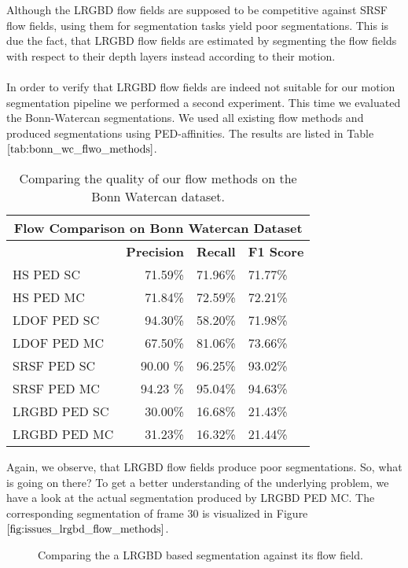 Although the LRGBD flow fields are supposed to be competitive against SRSF flow fields, using them for segmentation tasks yield poor segmentations. This is due the fact, that LRGBD flow fields are estimated by segmenting the flow fields with respect to their depth layers instead according to their motion. \\ \\

In order to verify that LRGBD flow fields are indeed not suitable for our motion segmentation pipeline we performed a second experiment. This time we evaluated the Bonn-Watercan segmentations. We used all existing flow methods and produced segmentations using PED-affinities. The results are listed in Table $\ref{tab:bonn_wc_flwo_methods}$.
\begin{table}[H]
\centering
\begin{tabular}{|l|r|l|l|}
\hline
\multicolumn{4}{|c|}{Flow Comparison on Bonn Watercan Dataset} \\ \hline
& \textbf{Precision} & \textbf{Recall} & \textbf{F1 Score} \\ \hline            
HS PED SC  & 71.59\%   & 71.96\%     & 71.77\%  \\ \hline
HS PED MC  & 71.84\%   & 72.59\%     & 72.21\%  \\ \hline                        
LDOF PED SC  & 94.30\%   & 58.20\%     & 71.98\%  \\ \hline
LDOF PED MC  & 67.50\%   & 81.06\%     & 73.66\%  \\ \hline
SRSF PED SC & 90.00 \%   & 96.25\%     & 93.02\%  \\ \hline
SRSF PED MC & 94.23 \%   & 95.04\%     & 94.63\%  \\ \hline
LRGBD PED SC & 30.00\%   & 16.68\%     & 21.43\%  \\ \hline
LRGBD PED MC & 31.23\%   & 16.32\%     & 21.44\%  \\ \hline
\end{tabular}
\caption[Flow Method Comparission Bonn Watercan]{Comparing the quality of our flow methods on the Bonn Watercan dataset.}
\label{tab:bonn_wc_flwo_methods}
\end{table}
Again, we observe, that LRGBD flow fields produce poor segmentations. So, what is going on there? To get a better understanding of the underlying problem, we have a look at the actual segmentation produced by LRGBD PED MC. The corresponding segmentation of frame 30 is visualized in Figure $\ref{fig:issues_lrgbd_flow_methods}$. 
\begin{figure}[H]
\begin{center}
\end{center}
\caption[Issue with LRGBD Flow Fields]{Comparing the a LRGBD based segmentation against its flow field.}
\label{fig:issues_lrgbd_flow_methods}
\end{figure}
